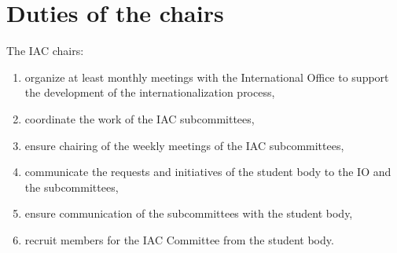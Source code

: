 {\protect\section{Duties of the chairs}
The IAC chairs:
\protect\begin{enumerate}
	\item organize at least monthly meetings with the International Office to support the development of the internationalization process,
	\item coordinate the work of the IAC subcommittees,
	\item ensure chairing of the weekly meetings of the IAC subcommittees,
	\item communicate the requests and initiatives of the student body to the IO and the subcommittees,
	\item ensure communication of the subcommittees with the student body,
	\item recruit members for the IAC Committee from the student body.	
\end{enumerate}
}

